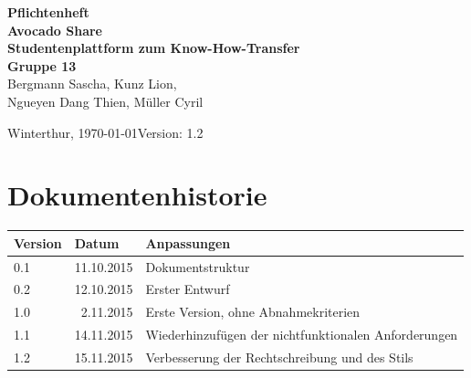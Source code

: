 \documentclass{avocado}
\title{\title}
\author{\autorA \and \autorB \and \autorC \and \autorD \and \autorD}
\newcommand{\titel}{Avocado Share}
\newcommand{\doctype}{Pflichtenheft}
\newcommand{\untertitel}{Studentenplattform zum Know-How-Transfer}
\newcommand{\datum}{\today}
\newcommand{\team}{Gruppe 13}
\newcommand{\autorA}{Bergmann Sascha}
\newcommand{\autorB}{Kunz Lion}
\newcommand{\autorC}{Ngueyen Dang Thien}
\newcommand{\autorD}{Müller Cyril}
\newcommand{\ort}{Winterthur}
\newcommand{\dozent}{}
\newcommand{\betreuer}{}
\newcommand{\version}{1.2}
\begin{document}



\thispagestyle{plain}

\begin{titlepage}
    \begin{flushleft}
        \vspace*{1cm}
        \textbf{
            \hspace{-0.12cm}\LARGE{\doctype}\\
            \Huge{\titel}\\
            \vspace{0.5cm}
            \large{\untertitel}\\
            \vspace{1.5cm}
            \large{\team\\}
        }
            \large{\autorA, \autorB,\\\autorC, \autorD}\\
        \vspace{1cm}
        \vfill
        \large{

            \ort, \datum \hfill Version: \version
        }
    \end{flushleft}
\end{titlepage}

\section*{Dokumentenhistorie}
\begin{tabularx}{\linewidth}{|l|r|X|} \hline
Version & \multicolumn{1}{l|}{Datum} 			& Anpassungen \\ \hline
0.1 & 11.10.2015		& Dokumentstruktur \\ \hline
0.2	& 12.10.2015       & Erster Entwurf  \\ \hline
1.0 &  2.11.2015		& Erste Version, ohne Abnahmekriterien \\ \hline
1.1 & 14.11.2015        & Wiederhinzufügen der nichtfunktionalen Anforderungen \\ \hline
1.2 & 15.11.2015        & Verbesserung der Rechtschreibung und des Stils\\ \hline
\end{tabularx}
\vfill
\end{document}
